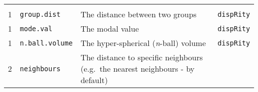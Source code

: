 \documentclass[
]{book}
\begin{document}
\begin{longtable}[]{@{}llll@{}}
\begin{minipage}[t]{0.10\columnwidth}
\end{minipage}\tabularnewline
\begin{minipage}[t]{0.07\columnwidth}\raggedright
1\strut
\end{minipage} & \begin{minipage}[t]{0.07\columnwidth}\raggedright
\texttt{group.dist}\strut
\end{minipage} & \begin{minipage}[t]{0.64\columnwidth}\raggedright
The distance between two groups\strut
\end{minipage} & \begin{minipage}[t]{0.10\columnwidth}\raggedright
\texttt{dispRity}\strut
\end{minipage}\tabularnewline
\begin{minipage}[t]{0.07\columnwidth}\raggedright
1\strut
\end{minipage} & \begin{minipage}[t]{0.07\columnwidth}\raggedright
\texttt{mode.val}\strut
\end{minipage} & \begin{minipage}[t]{0.64\columnwidth}\raggedright
The modal value\strut
\end{minipage} & \begin{minipage}[t]{0.10\columnwidth}\raggedright
\texttt{dispRity}\strut
\end{minipage}\tabularnewline
\begin{minipage}[t]{0.07\columnwidth}\raggedright
1\strut
\end{minipage} & \begin{minipage}[t]{0.07\columnwidth}\raggedright
\texttt{n.ball.volume}\strut
\end{minipage} & \begin{minipage}[t]{0.64\columnwidth}\raggedright
The hyper-spherical (\emph{n}-ball) volume\strut
\end{minipage} & \begin{minipage}[t]{0.10\columnwidth}\raggedright
\texttt{dispRity}\strut
\end{minipage}\tabularnewline
\begin{minipage}[t]{0.07\columnwidth}\raggedright
2\strut
\end{minipage} & \begin{minipage}[t]{0.07\columnwidth}\raggedright
\texttt{neighbours}\strut
\end{minipage} & \begin{minipage}[t]{0.64\columnwidth}\raggedright
The distance to specific neighbours (e.g.~the nearest neighbours - by default)\strut

\end{minipage}
\end{longtable}
\end{document}

